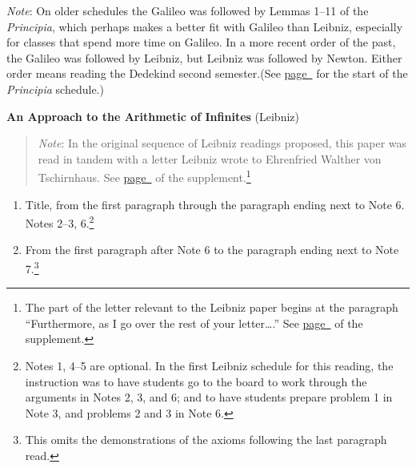 \documentclass[10pt]{article}
\begin{document}
{\small \emph{Note}: On older schedules the Galileo was followed by Lemmas 1--11 of the \emph{Principia}, which perhaps makes a better fit with Galileo than Leibniz, especially for classes that spend more time on Galileo. In a more recent order of the past, the Galileo was followed by Leibniz, but Leibniz was followed by Newton. Either order means reading the Dedekind second semester.(See \hyperref[NewtonStart]{page~\pageref{NewtonStart}} for the start of the \emph{Principia} schedule.)

\textbf{An Approach to the Arithmetic of Infinites} (Leibniz)
\label{LeibnizInfinites}
\vspace{-0.7em}
\begin{quote}
	\small{\emph{Note}: In the original sequence of Leibniz readings proposed, this paper was read in tandem with a letter Leibniz wrote to Ehrenfried Walther von Tschirnhaus. See
	\hyperref[supple.86]{page~\pageref{supple.86}} of the
	supplement.}\footnote{The part of the letter relevant to the Leibniz paper begins at the paragraph ``Furthermore, as I go over the rest of your letter\ldots.'' See \hyperref[supple.92]{page~\pageref{supple.92}} of the supplement.}
\end{quote}
\begin{enumerate}[resume*]
	\item Title, from the first paragraph through the paragraph ending next
		to Note 6. Notes 2--3, 6.\footnote{Notes 1, 4--5 are optional. In the first Leibniz schedule for this reading, the instruction was to have students go to the board to work through the arguments in Notes 2, 3, and 6; and to have students prepare problem 1 in Note 3, and problems 2 and 3 in Note 6.}
	\item From the first paragraph after
		Note 6 to the paragraph ending next to
		Note 7.\footnote{This omits the
			demonstrations of the axioms following the last paragraph read.}
\end{enumerate}

}
\end{document}
